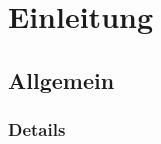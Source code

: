 \newcommand{\TITLE}{Readiness for Tailored Attacks and Lateral Movement Detection}
\newcommand{\VERSION}{0.0}







\newpage

\begin{versionhistory}
\end{versionhistory}


\newpage
\tableofcontents

\newpage
\section{Einleitung}
\cite{Allgemein}
\subsection{Allgemein}

\subsubsection{Details}

\clearpage


